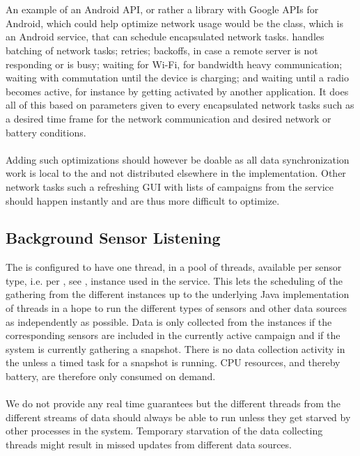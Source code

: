 \\\\
An example of an Android API, or rather a library with Google APIs for Android, which could help optimize network usage would be the  class, which is an Android service, that can schedule encapsulated network tasks.  \parencite{gcmnetworkmanager} handles batching of network tasks; retries; backoffs, in case a remote server is not responding or is busy; waiting for Wi-Fi, for bandwidth heavy communication; waiting with commutation until the device is charging; and waiting until a radio becomes active, for instance by getting activated by another application. It does all of this based on parameters given to every encapsulated network tasks such as a desired time frame for the network communication and desired network or battery conditions.  
\\\\
Adding such optimizations should however be doable as all data synchronization work is local to the  and not distributed elsewhere in the implementation. Other network tasks such a refreshing GUI with lists of campaigns from the service should happen instantly and are thus more difficult to optimize. 

\subsection{Background Sensor Listening}
The  is configured to have one thread, in a pool of threads, available per sensor type, i.e. per , see , instance used in the service. This lets the scheduling of the gathering from the different  instances up to the underlying Java implementation of threads in a hope to run the different types of sensors and other data sources as independently as possible. Data is only collected from the  instances if the corresponding sensors are included in the currently active campaign and if the system is currently gathering a snapshot. There is no data collection activity in the  unless a timed task for a snapshot is running. CPU resources, and thereby battery, are therefore only consumed on demand.
\\\\
We do not provide any real time guarantees but the different threads from the different streams of data should always be able to run unless they get starved by other processes in the system. Temporary starvation of the data collecting threads might result in missed updates from different data sources. 

